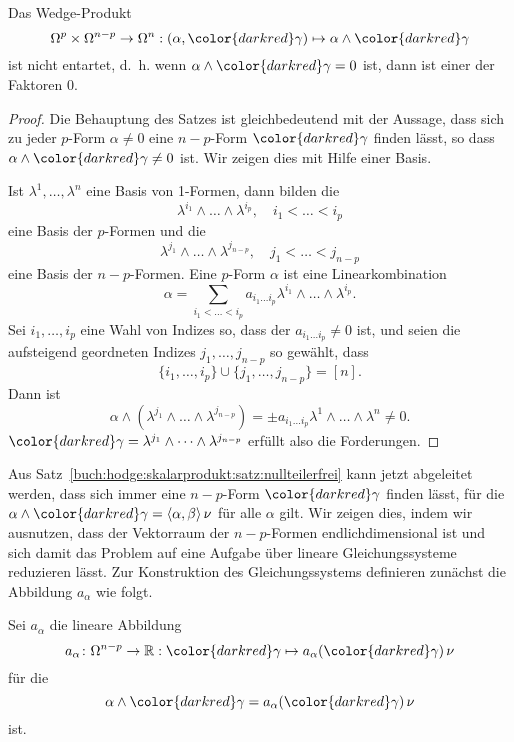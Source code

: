 \begin{satz}
\label{buch:hodge:skalarprodukt:satz:nullteilerfrei}
Das Wedge-Produkt
\[
\Omega^p \times \Omega^{n-p}
\to
\Omega^n
:
(\alpha,{\color{darkred}\gamma})
\mapsto
\alpha\wedge{\color{darkred}\gamma}
\]
ist nicht entartet, d.~h. wenn $\alpha\wedge{\color{darkred}\gamma}=0$
ist, dann ist einer der Faktoren 0.
\end{satz}

\begin{proof}
Die Behauptung des Satzes ist gleichbedeutend mit der Aussage, dass 
sich zu jeder $p$-Form $\alpha\ne 0$ eine $n-p$-Form ${\color{darkred}\gamma}$
finden lässt, so dass $\alpha\wedge{\color{darkred}\gamma}\ne  0$ ist.
Wir zeigen dies mit Hilfe einer Basis.

Ist $\lambda^1,\dots,\lambda^n$ eine Basis von 1-Formen, dann bilden
die
\[
\lambda^{i_1}\wedge\dots\wedge\lambda^{i_p},\quad i_1<\dots<i_p
\]
eine Basis der $p$-Formen und die
\[
\lambda^{j_1}\wedge\dots\wedge\lambda^{j_{n-p}},\quad j_1<\dots<j_{n-p}
\]
eine Basis der $n-p$-Formen.
Eine $p$-Form $\alpha$ ist eine Linearkombination
\[
\alpha
=
\sum_{i_1<\dots<i_p}
a_{i_1\dots i_p} \lambda^{i_1}\wedge\dots\wedge \lambda^{i_p}.
\]
Sei $i_1,\dots,i_p$ eine Wahl von Indizes so, dass
der $a_{i_1\dots i_p}\ne 0$ ist, und seien die aufsteigend geordneten
Indizes $j_1,\dots,j_{n-p}$ so gewählt, dass
\[
\{i_1,\dots,i_p\}\cup\{j_1,\dots,j_{n-p}\} = [n].
\]
Dann ist
\[
\alpha\wedge(\lambda^{j_1}\wedge\dots\wedge\lambda^{j_{n-p}})
=
\pm
a_{i_1\dots i_p} \lambda^1\wedge\dots\wedge\lambda^n
\ne
0.
\]
${\color{darkred}\gamma}=\lambda^{j_1}\wedge\dots\wedge\lambda^{j_{n-p}}$
erfüllt also die Forderungen.
\end{proof}

Aus Satz~\ref{buch:hodge:skalarprodukt:satz:nullteilerfrei} kann jetzt
abgeleitet werden, dass sich immer eine $n-p$-Form ${\color{darkred}\gamma}$
finden lässt, für die $\alpha\wedge{\color{darkred}\gamma}=
\langle\alpha,\beta\rangle\,\nu$ für alle $\alpha$ gilt.
Wir zeigen dies, indem wir ausnutzen, dass der Vektorraum der
$n-p$-Formen endlichdimensional ist und sich damit das Problem
auf eine Aufgabe über lineare Gleichungssysteme reduzieren lässt.
Zur Konstruktion des Gleichungssystems definieren zunächst die
Abbildung $a_\alpha$ wie folgt.

\begin{definition}
Sei $a_\alpha$ die lineare Abbildung
\[
a_\alpha
\colon
\Omega^{n-p}
\to
\mathbb{R}
:
{\color{darkred}\gamma}
\mapsto
a_\alpha({\color{darkred}\gamma})\,\nu
\]
für die
\[
\alpha\wedge{\color{darkred}\gamma}
=
a_\alpha({\color{darkred}\gamma})\,\nu
\]
ist.
\end{definition}

